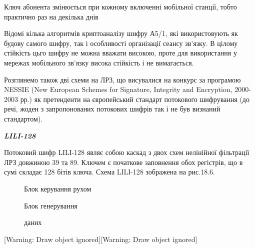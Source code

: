 Ключ абонента змінюється при кожному включенні мобільної станції, тобто
практично раз на декілька днів

Відомі кілька алгоритмів криптоаналізу шифру А5/1, які використовують як будову
самого шифру, так і особливості організації сеансу зв’язку. В цілому стійкість
цьго шифру не можна вважати високою, проте для використання у мережах
мобільного зв’язку висока стійкість і не вимагається.

Розглянемо також дві схеми на ЛРЗ, що висувалися на конкурс за програмою NESSIE
(New European Schemes for Signature, Integrity and Encryption, 2000-2003 рр.)
як претенденти на європейський стандарт потокового шифрування (до речі, жоден з
запропонованих потокових шифрів так і не був визнаний стандартом).


\bigskip


\bigskip


\bigskip

{\centering\bfseries\itshape
LILI{}-128
\par}


\bigskip

Потоковий шифр LILІ-128 являє собою каскад з двох схем нелінійної фільтрації ЛРЗ
довжиною 39 та 89. Ключем є початкове заповнення обох регістрів, що в сумі
складає 128 бітів ключа. Схема LILІ-128 зображена на рис.18.6.


\bigskip



\begin{figure}
\centering
\begin{minipage}{1.4583in}
{\centering
Блок керування рухом
\par}
\end{minipage}
\end{figure}
\begin{figure}
\centering
\begin{minipage}{1.9791in}
{\centering
Блок генерування
\par}

{\centering
даних
\par}
\end{minipage}
\end{figure}
[Warning: Draw object ignored][Warning: Draw object ignored]

